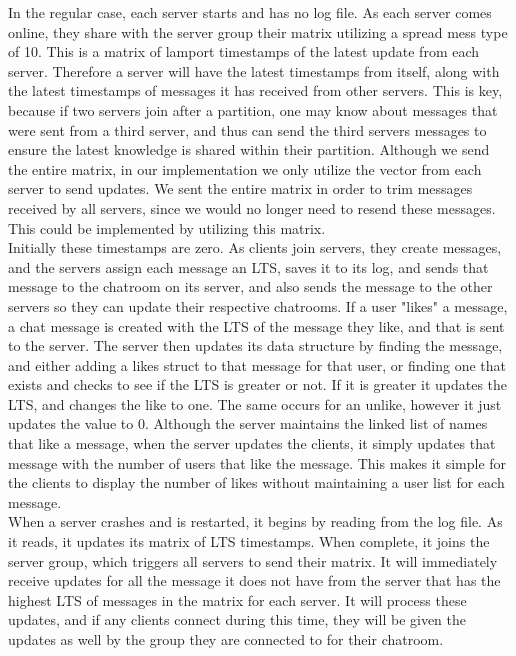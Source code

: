 \documentclass[12pt,journal,compsoc]{IEEEtran}
\begin{document}
In the regular case, each server starts and has no log file.  As each server comes online, they share with the server group their matrix utilizing a spread mess type of 10.  This is a matrix of lamport timestamps of the latest update from each server.  Therefore a server will have the latest timestamps from itself, along with the latest timestamps of messages it has received from other servers.  This is key, because if two servers join after a partition, one may know about messages that were sent from a third server, and thus can send the third servers messages to ensure the latest knowledge is shared within their partition.  Although we send the entire matrix, in our implementation we only utilize the vector from each server to send updates.  We sent the entire matrix in order to trim messages received by all servers, since we would no longer need to resend these messages.  This could be implemented by utilizing this matrix.\\
Initially these timestamps are zero.  As clients join servers, they create messages, and the servers assign each message an LTS, saves it to its log, and sends that message to the chatroom on its server, and also sends the message to the other servers so they can update their respective chatrooms.  If a user "likes" a message, a chat message is created with the LTS of the message they like, and that is sent to the server.  The server then updates its data structure by finding the message, and either adding a likes struct to that message for that user, or finding one that exists and checks to see if the LTS is greater or not.  If it is greater it updates the LTS, and changes the like to one.  The same occurs for an unlike, however it just updates the value to 0.  Although the server maintains the linked list of names that like a message, when the server updates the clients, it simply updates that message with the number of users that like the message.  This makes it simple for the clients to display the number of likes without maintaining a user list for each message.\\
When a server crashes and is restarted, it begins by reading from the log file.  As it reads, it updates its matrix of LTS timestamps.  When complete, it joins the server group, which triggers all servers to send their matrix.  It will immediately receive updates for all the message it does not have from the server that has the highest LTS of messages in the matrix for each server.  It will process these updates, and if any clients connect during this time, they will be given the updates as well by the group they are connected to for their chatroom.
\end{document}
